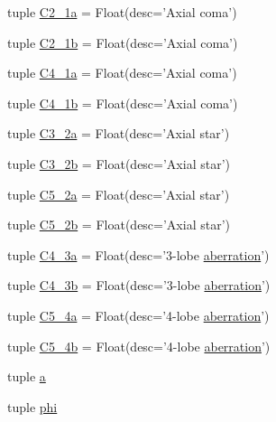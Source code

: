 \begin{DoxyCompactItemize}
\item 
tuple \hyperlink{classaberrations_1_1_ab_krivanek_a6dcdbacc8d723b2a55c3236b1982af95}{C2\-\_\-1a} = Float(desc='Axial coma')
\item 
tuple \hyperlink{classaberrations_1_1_ab_krivanek_a827343cc3727f0f4d64d99051f79ca9f}{C2\-\_\-1b} = Float(desc='Axial coma')
\item 
tuple \hyperlink{classaberrations_1_1_ab_krivanek_ae8cc3279df6c913aa9179fae414c1dd9}{C4\-\_\-1a} = Float(desc='Axial coma')
\item 
tuple \hyperlink{classaberrations_1_1_ab_krivanek_a3840460e6c3a4d80a704e32dd8d9cd7d}{C4\-\_\-1b} = Float(desc='Axial coma')
\item 
tuple \hyperlink{classaberrations_1_1_ab_krivanek_a86e1ae8031fd414b99346ce5ccbe937c}{C3\-\_\-2a} = Float(desc='Axial star')
\item 
tuple \hyperlink{classaberrations_1_1_ab_krivanek_af86229f760e7b5f1f9fe191c93594d1c}{C3\-\_\-2b} = Float(desc='Axial star')
\item 
tuple \hyperlink{classaberrations_1_1_ab_krivanek_a1d76afe5495f60132fab0f7465737b0c}{C5\-\_\-2a} = Float(desc='Axial star')
\item 
tuple \hyperlink{classaberrations_1_1_ab_krivanek_a34039ce0ac088661a604adaea5cb80b3}{C5\-\_\-2b} = Float(desc='Axial star')
\item 
tuple \hyperlink{classaberrations_1_1_ab_krivanek_ae316c7dc0ea6f28b04bfd2100764099e}{C4\-\_\-3a} = Float(desc='3-\/lobe \hyperlink{aberrations___t_e_m_8m_add6b7c5f8447a629106b3fae4a009eb8}{aberration}')
\item 
tuple \hyperlink{classaberrations_1_1_ab_krivanek_a8cf52df7725ea8a872e55e64d8723066}{C4\-\_\-3b} = Float(desc='3-\/lobe \hyperlink{aberrations___t_e_m_8m_add6b7c5f8447a629106b3fae4a009eb8}{aberration}')
\item 
tuple \hyperlink{classaberrations_1_1_ab_krivanek_a891846dfeba7bb569ca05988addbf780}{C5\-\_\-4a} = Float(desc='4-\/lobe \hyperlink{aberrations___t_e_m_8m_add6b7c5f8447a629106b3fae4a009eb8}{aberration}')
\item 
tuple \hyperlink{classaberrations_1_1_ab_krivanek_a7ce620a43e01049640bdd0fac68fe76e}{C5\-\_\-4b} = Float(desc='4-\/lobe \hyperlink{aberrations___t_e_m_8m_add6b7c5f8447a629106b3fae4a009eb8}{aberration}')
\item 
tuple \hyperlink{classaberrations_1_1_ab_krivanek_a64acaf45047a7edb58b22723a142d438}{a}
\item 
tuple \hyperlink{classaberrations_1_1_ab_krivanek_a4fef2670dae44658f6ca6f9c3804d96c}{phi}
\end{DoxyCompactItemize}
